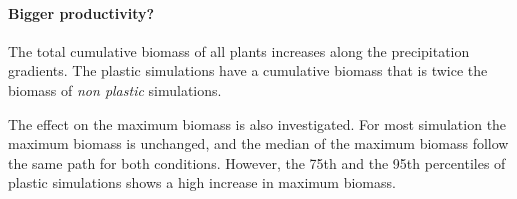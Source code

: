 \paragraph{Bigger productivity?}

The total cumulative biomass of all plants increases along the precipitation gradients. The plastic simulations have a cumulative biomass that is twice the biomass of \textit{non plastic} simulations.


\begin{figure}\label{fig:total_BM}
    \classiccaptionstyle
{}
\end{figure}

The effect on the maximum biomass is also investigated. For most simulation the maximum biomass is unchanged, and the median of the maximum biomass follow the same path for both conditions. However, the 75th and the 95th percentiles of plastic simulations shows a high increase in maximum biomass.


